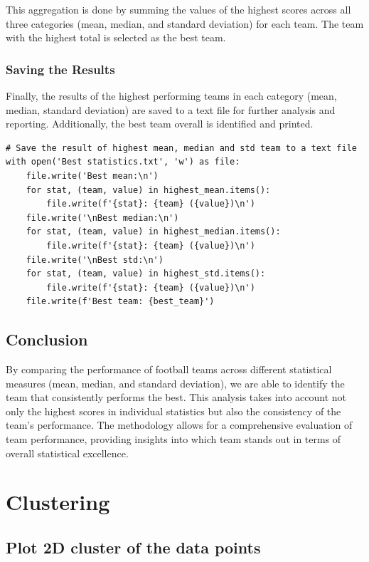 \documentclass[a4paper,12pt]{article}
\begin{document}
This aggregation is done by summing the values of the highest scores across all three categories (mean, median, and standard deviation) for each team. The team with the highest total is selected as the best team.

\subsubsection{Saving the Results}

Finally, the results of the highest performing teams in each category (mean, median, standard deviation) are saved to a text file for further analysis and reporting. Additionally, the best team overall is identified and printed.

\begin{verbatim}
# Save the result of highest mean, median and std team to a text file
with open('Best statistics.txt', 'w') as file:
    file.write('Best mean:\n')
    for stat, (team, value) in highest_mean.items():
        file.write(f'{stat}: {team} ({value})\n')
    file.write('\nBest median:\n')
    for stat, (team, value) in highest_median.items():
        file.write(f'{stat}: {team} ({value})\n')
    file.write('\nBest std:\n')
    for stat, (team, value) in highest_std.items():
        file.write(f'{stat}: {team} ({value})\n')
    file.write(f'Best team: {best_team}')
\end{verbatim}

\subsection{Conclusion}

By comparing the performance of football teams across different statistical measures (mean, median, and standard deviation), we are able to identify the team that consistently performs the best. This analysis takes into account not only the highest scores in individual statistics but also the consistency of the team's performance. The methodology allows for a comprehensive evaluation of team performance, providing insights into which team stands out in terms of overall statistical excellence.

\newpage

\section{Clustering}
\subsection{Plot 2D cluster of the data points}
\end{document}
